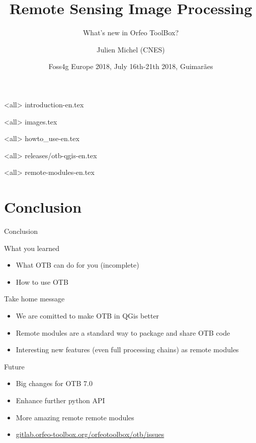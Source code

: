 \documentclass[8pt]{beamer}
\title{Remote Sensing Image Processing}
\subtitle{What's new in Orfeo ToolBox?}
\author{Julien Michel (CNES)}
\date{Foss4g Europe 2018, July 16th-21th 2018, Guimarães}
\begin{document}
\begin{frame}
\titlepage
\end{frame}

\mode<all>
{introduction-en.tex}

\mode<all>
{images.tex}


\mode<all>
{howto_use-en.tex}

\mode<all>
{releases/otb-qgis-en.tex}

\mode<all>
{remote-modules-en.tex}

\section*{Conclusion}

\begin{frame}{Conclusion}

  \begin{block}{What you learned}
    \begin{itemize}
      \item What OTB can do for you (incomplete)
      \item How to use OTB
    \end{itemize}
  \end{block}
  
  \begin{block}{Take home message}
    \begin{itemize}
    \item We are comitted to make OTB in QGis better
    \item Remote modules are a standard way to package and share OTB code
    \item Interesting new features (even full processing chains) as remote modules
    \end{itemize}
  \end{block}

  \begin{block}{Future}
    \begin{itemize}
      \item Big changes for OTB 7.0
      \item Enhance further python API
      \item More amazing remote remote modules
      \item \url{gitlab.orfeo-toolbox.org/orfeotoolbox/otb/issues}
    \end{itemize}
  \end{block}
\end{frame}
\end{document}
